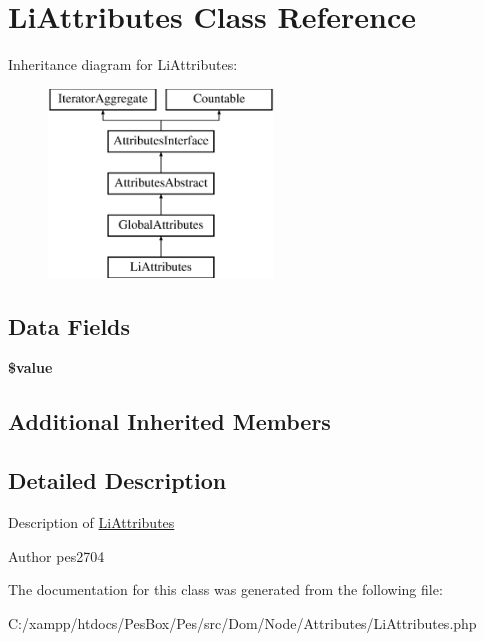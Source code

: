 \hypertarget{class_pes_1_1_dom_1_1_node_1_1_attributes_1_1_li_attributes}{}\section{Li\+Attributes Class Reference}
\label{class_pes_1_1_dom_1_1_node_1_1_attributes_1_1_li_attributes}
Inheritance diagram for Li\+Attributes\+:\begin{figure}[H]
\begin{center}
\leavevmode
\includegraphics[height=5.000000cm]{class_pes_1_1_dom_1_1_node_1_1_attributes_1_1_li_attributes}
\end{center}
\end{figure}
\subsection*{Data Fields}
\begin{DoxyCompactItemize}
\item 
\mbox{\label{class_pes_1_1_dom_1_1_node_1_1_attributes_1_1_li_attributes_a0f298096f322952a72a50f98a74c7b60}} 
{\bfseries \$value}
\end{DoxyCompactItemize}
\subsection*{Additional Inherited Members}


\subsection{Detailed Description}
Description of \mbox{\hyperlink{class_pes_1_1_dom_1_1_node_1_1_attributes_1_1_li_attributes}{Li\+Attributes}}

\begin{DoxyAuthor}{Author}
pes2704 
\end{DoxyAuthor}


The documentation for this class was generated from the following file\+:\begin{DoxyCompactItemize}
\item 
C\+:/xampp/htdocs/\+Pes\+Box/\+Pes/src/\+Dom/\+Node/\+Attributes/Li\+Attributes.\+php\end{DoxyCompactItemize}
